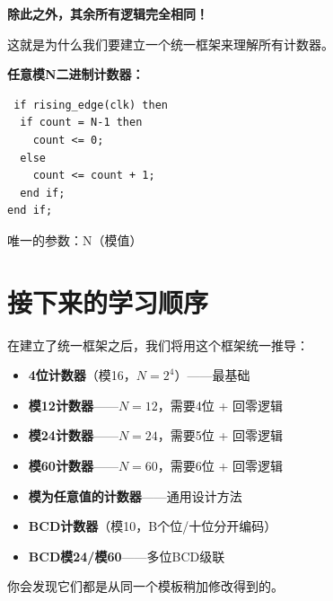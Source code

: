 \textbf{除此之外，其余所有逻辑完全相同！}

这就是为什么我们要建立一个统一框架来理解所有计数器。

\begin{keypoint}[计数器统一公式]
\textbf{任意模N二进制计数器：}
\end{keypoint}

\begin{lstlisting}
 if rising_edge(clk) then
  if count = N-1 then
    count <= 0;
  else
    count <= count + 1;
  end if;
end if;
\end{lstlisting}

唯一的参数：N（模值）

\section{接下来的学习顺序}

在建立了统一框架之后，我们将用这个框架统一推导：

\begin{itemize}
  \item \textbf{4位计数器}（模16，$N = 2^4$）——最基础
  \item \textbf{模12计数器}——$N = 12$，需要4位 + 回零逻辑
  \item \textbf{模24计数器}——$N = 24$，需要5位 + 回零逻辑
  \item \textbf{模60计数器}——$N = 60$，需要6位 + 回零逻辑
  \item \textbf{模为任意值的计数器}——通用设计方法
  \item \textbf{BCD计数器}（模10，B个位/十位分开编码）
  \item \textbf{BCD模24/模60}——多位BCD级联
\end{itemize}

你会发现它们都是从同一个模板稍加修改得到的。
